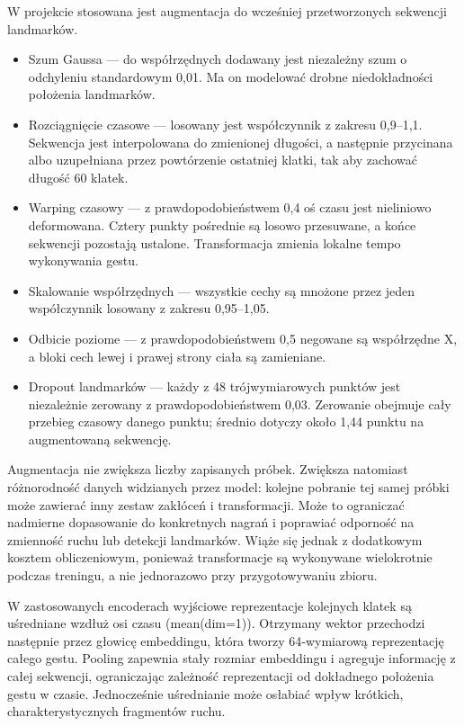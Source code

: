 W projekcie stosowana jest augmentacja do wcześniej przetworzonych sekwencji landmarków.
\begin{itemize}
\item Szum Gaussa — do współrzędnych dodawany jest niezależny szum o odchyleniu standardowym 0,01. Ma on modelować drobne niedokładności położenia landmarków.
\item Rozciągnięcie czasowe — losowany jest współczynnik z zakresu 0,9–1,1. Sekwencja jest interpolowana do zmienionej długości, a następnie przycinana albo uzupełniana przez powtórzenie ostatniej klatki, tak aby zachować długość 60 klatek.
\item Warping czasowy — z prawdopodobieństwem 0,4 oś czasu jest nieliniowo deformowana. Cztery punkty pośrednie są losowo przesuwane, a końce sekwencji pozostają ustalone. Transformacja zmienia lokalne tempo wykonywania gestu.
\item Skalowanie współrzędnych — wszystkie cechy są mnożone przez jeden współczynnik losowany z zakresu 0,95–1,05.
\item Odbicie poziome — z prawdopodobieństwem 0,5 negowane są współrzędne X, a bloki cech lewej i prawej strony ciała są zamieniane.
\item Dropout landmarków — każdy z 48 trójwymiarowych punktów jest niezależnie zerowany z prawdopodobieństwem 0,03. Zerowanie obejmuje cały przebieg czasowy danego punktu; średnio dotyczy około 1,44 punktu na augmentowaną sekwencję.
\end{itemize}
Augmentacja nie zwiększa liczby zapisanych próbek. Zwiększa natomiast różnorodność danych widzianych przez model: kolejne pobranie tej samej próbki może zawierać inny zestaw zakłóceń i transformacji. Może to ograniczać nadmierne dopasowanie do konkretnych nagrań i poprawiać odporność na zmienność ruchu lub detekcji landmarków. Wiąże się jednak z dodatkowym kosztem obliczeniowym, ponieważ transformacje są wykonywane wielokrotnie podczas treningu, a nie jednorazowo przy przygotowywaniu zbioru.

W zastosowanych encoderach wyjściowe reprezentacje kolejnych klatek są uśredniane wzdłuż osi czasu (mean(dim=1)). Otrzymany wektor przechodzi następnie przez głowicę embeddingu, która tworzy 64‑wymiarową reprezentację całego gestu.
Pooling zapewnia stały rozmiar embeddingu i agreguje informację z całej sekwencji, ograniczając zależność reprezentacji od dokładnego położenia gestu w czasie. Jednocześnie uśrednianie może osłabiać wpływ krótkich, charakterystycznych fragmentów ruchu.

